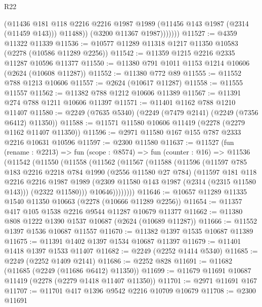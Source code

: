 \begin{lexlean}{R22}
\begin{coremodule}
                  (@11436
                    @181
                    @118
                    @2216
                    @2216
                    @1987
                    @1989
                    (@11456 @143 @1987 (@2314 (@11459 @143)))
                    @11488))
                (@3200 @11367 @1987)))))))
@11527 := @4359 @11322 @11339
@11536 := @10577 @11289 @11318 @1217 @11350 @10583 (@2278 (@10586 @11289 @2256))
@11542 := @11359 @1215 @2216 @2335 @11287 @10596 @11377
@11550 := @11380 @791 @1011 @1153 @1214 @10606 (@2624 (@10608 @11287))
@11552 := @11380 @772 @89
@11555 := @11552 @788 @1213 @10606
@11557 := @2624 (@10617 @11287)
@11558 := @11555 @11557
@11562 := @11382 @788 @1212 @10606 @11389
@11567 := @11391 @274 @788 @1211 @10606 @11397
@11571 := @11401 @1162 @788 @1210 @11407
@11580 := @2249 (@7635 @5340) (@2249 (@7479 @2141) (@2249 (@7356 @6412) @11350))
@11588 := @11571 @11580 @10606 @11419 (@2278 (@2279 @1162 @11407 @11350))
@11596 := @2971 @11580 @167 @155 @787 @2333 @2216 @10631 @10596
@11597 := @2300 @11580
@11637 := @11527
    (fun (rename : @2213) =>
    fun (scope : @8574) =>
    fun (counter : @16) =>
    @11536
      (@11542
        (@11550
          (@11558
            (@11562
              (@11567
                (@11588
                  (@11596
                    (@11597
                      @785
                      @183
                      @2216
                      @2218
                      @784
                      @1990
                      (@2556 @11580 @27 @784)
                      (@11597
                        @181
                        @118
                        @2216
                        @2216
                        @1987
                        @1989
                        (@2309 @11580 @143 @1987 (@2314 (@2315 @11580 @143)))
                        (@2322 @11580)))
                    @10646))))))))
@11646 := @10657 @11289 @11335 @1540 @11350 @10663 (@2278 (@10666 @11289 @2256))
@11654 := @11357 @417 @105 @1538 @2216 @9544 @11287 @10679 @11377
@11662 := @11380 @808 @1222 @1390 @1537 @10687 (@2624 (@10689 @11287))
@11666 := @11552 @1397 @1536 @10687 @11557
@11670 := @11382 @1397 @1535 @10687 @11389
@11675 := @11391 @1402 @1397 @1534 @10687 @11397
@11679 := @11401 @1418 @1397 @1533 @11407
@11682 := @2249 (@2252 @1414 @5340)
@11685 := @2249 (@2252 @1409 @2141)
@11686 := @2252 @828
@11691 := @11682 (@11685 (@2249 (@11686 @6412) @11350))
@11699 := @11679 @11691 @10687 @11419 (@2278 (@2279 @1418 @11407 @11350))
@11701 := @2971 @11691 @167
@11707 := @11701 @417 @1396 @9542 @2216 @10709 @10679
@11708 := @2300 @11691

\end{coremodule}
\end{lexlean}

